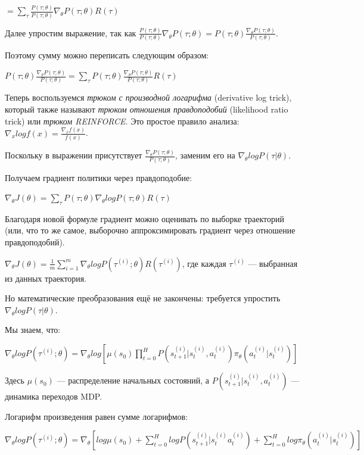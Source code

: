 \documentclass[11pt,a4paper]{article}
\begin{document}
\(= \sum_{\tau} \frac{P(\tau;\theta)}{P(\tau;\theta)}\nabla_\theta P(\tau;\theta)R(\tau)\)

Далее упростим выражение, так как \(\frac{P(\tau;\theta)}{P(\tau;\theta)}\nabla_\theta P(\tau;\theta) =  P(\tau;\theta)\frac{\nabla_\theta P(\tau;\theta)}{P(\tau;\theta)}\).

Поэтому сумму можно переписать следующим образом:

\(P(\tau;\theta)\frac{\nabla_\theta P(\tau;\theta)}{P(\tau;\theta)}= \sum_{\tau} P(\tau;\theta) \frac{\nabla_\theta P(\tau;\theta)}{P(\tau;\theta)}R(\tau)\)

Теперь воспользуемся \emph{трюком с производной логарифма} (derivative log trick), который также называют \emph{трюком отношения правдоподобий} (likelihood ratio trick) или \emph{трюком REINFORCE}. Это простое правило анализа: \(\nabla_x log f(x) = \frac{\nabla_x f(x)}{f(x)}\).

Поскольку в выражении присутствует \(\frac{\nabla_\theta P(\tau;\theta)}{P(\tau;\theta)}\), заменим его на \(\nabla_\theta log P(\tau|\theta)\).

Получаем градиент политики через правдоподобие:

\(\nabla_\theta J(\theta) = \sum_{\tau} P(\tau;\theta)  \nabla_\theta log P(\tau;\theta) R(\tau)\)

Благодаря новой формуле градиент можно оценивать по выборке траекторий (или, что то же самое, выборочно аппроксимировать градиент через отношение правдоподобий).

\(\nabla_\theta J(\theta) = \frac{1}{m} \sum^{m}_{i=1} \nabla_\theta log P(\tau^{(i)};\theta)R(\tau^{(i)})\), где каждая \(\tau^{(i)}\) --- выбранная из данных траектория.

Но математические преобразования ещё не закончены: требуется упростить \(\nabla_\theta log P(\tau|\theta)\).

Мы знаем, что:

\(\nabla_\theta log P(\tau^{(i)};\theta)= \nabla_\theta log[ \mu(s_0) \prod_{t=0}^{H} P(s_{t+1}^{(i)}|s_{t}^{(i)}, a_{t}^{(i)}) \pi_\theta(a_{t}^{(i)}|s_{t}^{(i)})]\)

Здесь \(\mu(s_0)\) --- распределение начальных состояний, а \(P(s_{t+1}^{(i)}|s_{t}^{(i)}, a_{t}^{(i)})\) --- динамика переходов MDP.

Логарифм произведения равен сумме логарифмов:

\(\nabla_\theta log P(\tau^{(i)};\theta)= \nabla_\theta \left[log \mu(s_0) + \sum\limits_{t=0}^{H}log P(s_{t+1}^{(i)}|s_{t}^{(i)} a_{t}^{(i)}) + \sum\limits_{t=0}^{H}log \pi_\theta(a_{t}^{(i)}|s_{t}^{(i)})\right]\)
\end{document}
